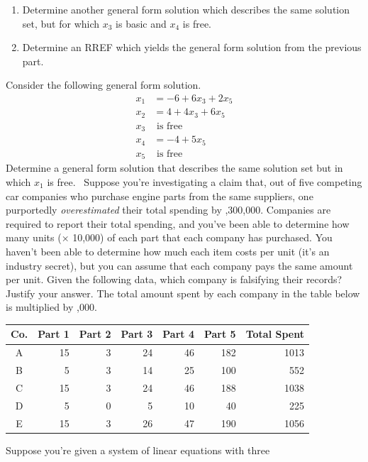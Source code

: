 \begin{tasks}[resume, style=enumerate]
\begin{enumerate}[label=(\alph*)]
  \item
    Determine another general form solution which describes the same
    solution set, but for which $x_3$ is basic and $x_4$ is free.
  \item
    Determine an RREF which yields the general form solution from the
    previous part.
  \end{enumerate}
\task
  Consider the following general form solution.
  \begin{align*}
    x_{1} &= -6 + 6x_{3} + 2x_{5} \\
    x_{2} &= 4 + 4x_{3} + 6x_{5} \\
    x_{3} &\text{ is free} \\
    x_{4} &= -4 + 5x_{5} \\
    x_{5} &\text{ is free}
  \end{align*}
  Determine a general form solution that describes the same solution
  set but in which $x_1$ is free.
\task
  \faCalculator \ Suppose you're investigating a claim that, out of
  five competing car companies who purchase engine parts from the same
  suppliers, one purportedly \textit{overestimated} their total
  spending by ,300,000.  Companies are required to report
  their total spending, and you've been able to determine how many
  units (× 10,000) of each part that each company has purchased.  You
  haven't been able to determine how much each item costs per unit
  (it's an industry secret), but you can assume that each company pays
  the same amount per unit.  Given the following data, which company
  is falsifying their records?  Justify your answer.  The total amount
  spent by each company in the table below is multiplied by
  ,000.
  \begin{center}
    \begin{tabular}{|c|r|r|r|r|r|r|}
      \hline
      Co. & Part 1 & Part 2 & Part 3 & Part 4 & Part 5 & Total Spent\\
      \hline
      A & 15 & 3 & 24 & 46 & 182 & 1013 \\
      B & 5 & 3 & 14 & 25 &100 & 552 \\
      C & 15 & 3 & 24 & 46 &188 & 1038 \\
      D & 5 & 0 &  5 & 10 & 40 & 225 \\
      E & 15 & 3 & 26 & 47 &190 & 1056 \\
      \hline
    \end{tabular}
  \end{center}
\task
  Suppose you're given a system of linear equations with three

\end{tasks}
